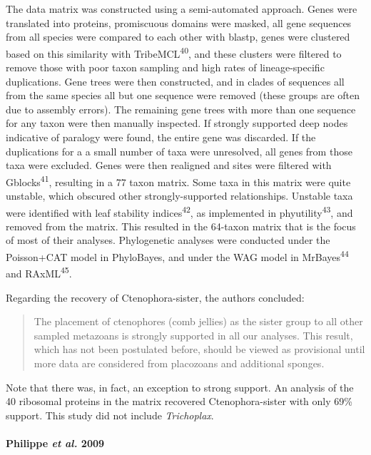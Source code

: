 \documentclass[]{article}
\let\oldparagraph\paragraph
\renewcommand{\paragraph}[1]{\oldparagraph{#1}\mbox{}}
\begin{document}
The data matrix was constructed using a semi-automated approach. Genes
were translated into proteins, promiscuous domains were masked, all gene
sequences from all species were compared to each other with blastp,
genes were clustered based on this similarity with
TribeMCL\textsuperscript{40}, and these clusters were filtered to remove
those with poor taxon sampling and high rates of lineage-specific
duplications. Gene trees were then constructed, and in clades of
sequences all from the same species all but one sequence were removed
(these groups are often due to assembly errors). The remaining gene
trees with more than one sequence for any taxon were then manually
inspected. If strongly supported deep nodes indicative of paralogy were
found, the entire gene was discarded. If the duplications for a a small
number of taxa were unresolved, all genes from those taxa were excluded.
Genes were then realigned and sites were filtered with
Gblocks\textsuperscript{41}, resulting in a 77 taxon matrix. Some taxa
in this matrix were quite unstable, which obscured other
strongly-supported relationships. Unstable taxa were identified with
leaf stability indices\textsuperscript{42}, as implemented in
phyutility\textsuperscript{43}, and removed from the matrix. This
resulted in the 64-taxon matrix that is the focus of most of their
analyses. Phylogenetic analyses were conducted under the Poisson+CAT
model in PhyloBayes, and under the WAG model in
MrBayes\textsuperscript{44} and RAxML\textsuperscript{45}.

Regarding the recovery of Ctenophora-sister, the authors concluded:

\begin{quote}
The placement of ctenophores (comb jellies) as the sister group to all
other sampled metazoans is strongly supported in all our analyses. This
result, which has not been postulated before, should be viewed as
provisional until more data are considered from placozoans and
additional sponges.
\end{quote}

Note that there was, in fact, an exception to strong support. An
analysis of the 40 ribosomal proteins in the matrix recovered
Ctenophora-sister with only 69\% support. This study did not include
\emph{Trichoplax}.

\hypertarget{philippe-et-al.-2009}{%
\paragraph{\texorpdfstring{Philippe \emph{et al.}
2009}{Philippe et al. 2009}}\label{philippe-et-al.-2009}}
\end{document}

